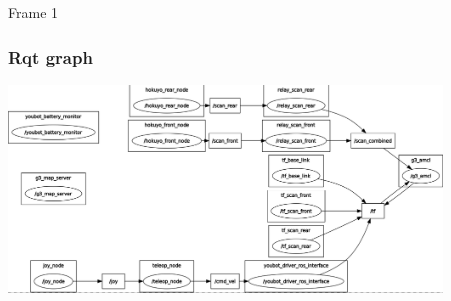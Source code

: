 
\begin{frame}{Frame 1}
\frametitle {Rqt graph}
 
	\centering
    \includegraphics[height=55mm]{slides/gfx/rqt_graph.png}
 
\end{frame}